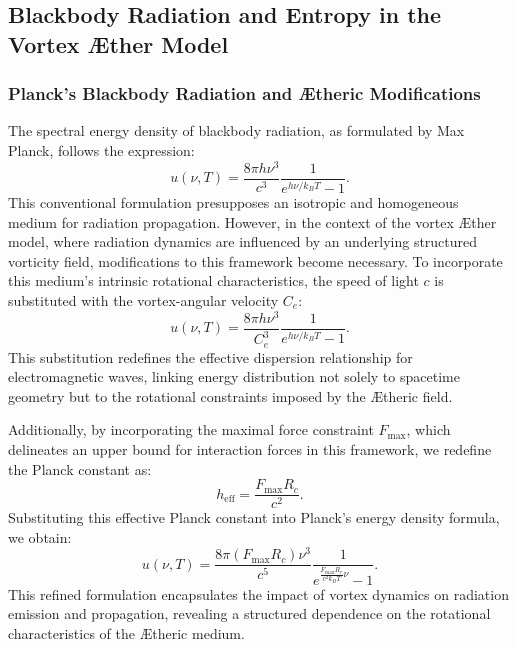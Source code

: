 
\subsection{Blackbody Radiation and Entropy in the Vortex Æther Model}


\subsubsection*{Planck's Blackbody Radiation and Ætheric Modifications}
The spectral energy density of blackbody radiation, as formulated by Max Planck, follows the expression:
\begin{equation*}
u(\nu, T) = \frac{8 \pi h \nu^3}{c^3} \frac{1}{e^{h \nu / k_B T} - 1}.
\end{equation*}
This conventional formulation presupposes an isotropic and homogeneous medium for radiation propagation. However, in the context of the vortex Æther model, where radiation dynamics are influenced by an underlying structured vorticity field, modifications to this framework become necessary. To incorporate this medium's intrinsic rotational characteristics, the speed of light $c$ is substituted with the vortex-angular velocity $C_e$:
\begin{equation*}
u(\nu, T) = \frac{8 \pi h \nu^3}{C_e^3} \frac{1}{e^{h \nu / k_B T} - 1}.
\end{equation*}
This substitution redefines the effective dispersion relationship for electromagnetic waves, linking energy distribution not solely to spacetime geometry but to the rotational constraints imposed by the Ætheric field.


Additionally, by incorporating the maximal force constraint $F_{\max}$, which delineates an upper bound for interaction forces in this framework, we redefine the Planck constant as:
\begin{equation*}
h_\text{eff} = \frac{F_{\max} R_c}{c^2}.
\end{equation*}
Substituting this effective Planck constant into Planck's energy density formula, we obtain:
\begin{equation*}
u(\nu, T) = \frac{8 \pi \left( F_{\max} R_c \right) \nu^3}{c^5} \frac{1}{e^{\frac{F_{\max} R_c}{c^2 k_B T} \nu} - 1}.
\end{equation*}
This refined formulation encapsulates the impact of vortex dynamics on radiation emission and propagation, revealing a structured dependence on the rotational characteristics of the Ætheric medium.


